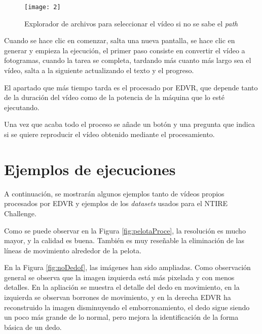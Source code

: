    
   	\begin{figure}[!h]
		\centering
		\texttt{[image: 2]}
		\caption{Explorador de archivos para seleccionar el vídeo si no se sabe el \emph{path}}\label{explo}
	\end{figure}

   
   Cuando se hace clic en comenzar, salta una nueva pantalla, se hace clic en generar y empieza la ejecución, el primer paso consiste en convertir el vídeo a fotogramas, cuando la tarea se completa, tardando más cuanto más largo sea el vídeo, salta a la siguiente actualizando el texto y el progreso. 
   
   
   El apartado que más tiempo tarda es el procesado por EDVR, que depende tanto de la duración del vídeo como de la potencia de la máquina que lo esté ejecutando.

    Una vez que acaba todo el proceso se añade un botón y una pregunta que indica si se quiere reproducir el vídeo obtenido mediante el procesamiento.

    
    
\section{Ejemplos de ejecuciones} 

A continuación, se mostrarán algunos ejemplos tanto de vídeos propios procesados por EDVR y ejemplos de los \emph{datasets} usados para el NTIRE Challenge.

  
Como se puede observar en la Figura \ref{fig:pelotaProce}, la resolución es mucho mayor, y la calidad es buena. También es muy reseñable la eliminación de las líneas de movimiento alrededor de la pelota.


En la Figura \ref{fig:noDedof}, las imágenes han sido ampliadas. Como observación general se observa que la imagen izquierda está más pixelada y con menos detalles. En la apliación se muestra el detalle del dedo en movimiento, en la izquierda se observan borrones de movimiento, y en la derecha EDVR ha reconstruido la imagen disminuyendo el emborronamiento, el dedo sigue siendo un poco más grande de lo normal, pero mejora la identificación de la forma básica de un dedo.

